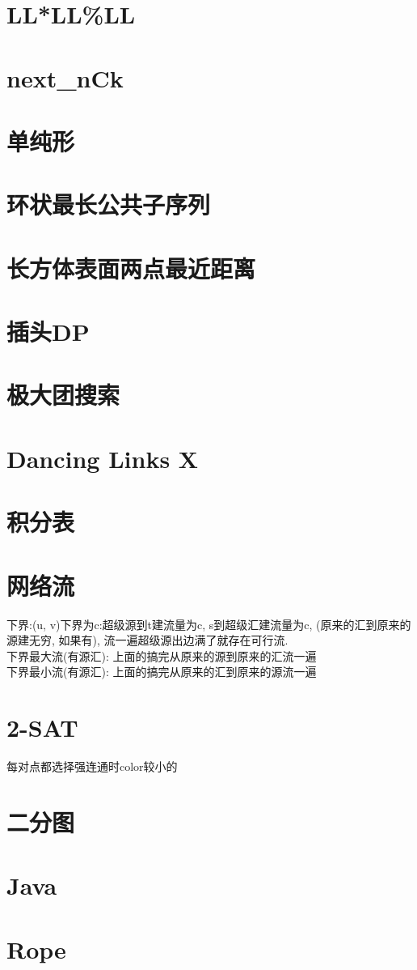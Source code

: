 \documentclass[landscape, twocolumn, 8pt, a4paper, twoside]{extarticle}
\begin{document}
\section{LL*LL\%LL}
	
\section{next\_nCk}
	
\section{单纯形}
	
\section{环状最长公共子序列}
	
\section{长方体表面两点最近距离}
	
\section{插头DP}
	
\section{极大团搜索}
	
\section{Dancing Links X}
	

\section{积分表}
	
\section{网络流}
	下界:(u, v)下界为c:超级源到t建流量为c, s到超级汇建流量为c, (原来的汇到原来的源建无穷, 如果有), 流一遍超级源出边满了就存在可行流.\\
	下界最大流(有源汇): 上面的搞完从原来的源到原来的汇流一遍\\
	下界最小流(有源汇): 上面的搞完从原来的汇到原来的源流一遍\\
\section{2-SAT}
	每对点都选择强连通时color较小的\\
\section{二分图}
	
\section{Java}
	
\section{Rope}
	
\end{document}
